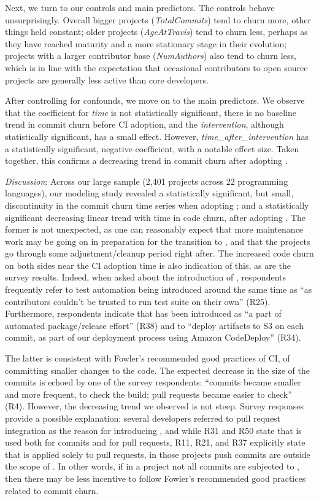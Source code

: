 Next, we turn to our controls and main predictors.
The controls behave unsurprisingly.
Overall bigger projects (\emph{TotalCommits}) tend to churn more, other things
held constant; older projects (\emph{AgeAtTravis}) tend to churn less, perhaps 
as they have reached maturity and a more stationary stage in their evolution;
projects with a larger contributor base (\emph{NumAuthors}) also tend to churn
less, which is in line with the expectation that occasional contributors to open 
source projects are generally less active than core developers.

After controlling for confounds, we move on to the main predictors. 
We observe that the coefficient for \emph{time} is not statistically significant, 
\ie there is no baseline trend in commit churn before CI adoption, and the 
\emph{intervention}, although statistically significant, has a small effect.
However, \emph{time\_after\_intervention} has a statistically significant, 
negative coefficient, with a notable effect size.
Taken together, this confirms a decreasing trend in commit churn after 
adopting \Tvis.

\smallskip\noindent \emph{Discussion}:
Across our large sample (2,401 projects across 22 programming languages),
our modeling study revealed a statistically significant, but small, discontinuity
in the commit churn time series when adopting \Tvis; and a statistically 
significant decreasing linear trend with time in code churn, after adopting \Tvis.
The former is not unexpected, as one can reasonably expect that more 
maintenance work may be going on in preparation for the transition to \Tvis, 
and that the projects go through some adjustment/cleanup period right after.
The increased code churn on both sides near the CI adoption time is also
indication of this, as are the survey results.  
Indeed, when asked about the introduction of \Tvis, respondents frequently refer to 
test automation being introduced around the same time as \Tvi ``as contributors 
couldn't be trusted to run test suite on their own'' (R25). Furthermore, respondents 
indicate that \Tvi has been introduced as ``a part of automated package/release effort'' (R38) 
and to ``deploy artifacts to S3 on each commit, as part of our deployment process using 
Amazon CodeDeploy'' (R34).

The latter is consistent with Fowler's recommended good practices of CI, of 
committing smaller changes to the code.
The expected decrease in the size of the commits is echoed by one of the 
survey respondents: ``commits became smaller and more frequent, to check 
the build; pull requests became easier to check'' (R4).
However, the decreasing trend we observed is not steep.
Survey responses provide a possible explanation: several developers 
referred to pull request integration as the reason for introducing \Tvis, and 
while R31 and R50 state that \Tvis is used both for commits and for pull 
requests, R11, R21, and R37 explicitly state that \Tvis is applied solely to 
pull requests, \ie in those projects push commits are outside the scope of \Tvis.
In other words, if in a project not all commits are subjected to \Tvis, then 
there may be less incentive to follow Fowler's recommended good practices 
related to commit churn.

